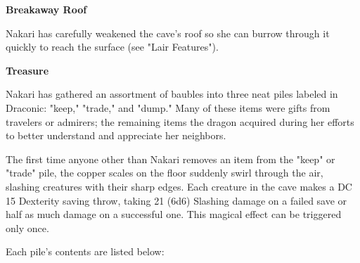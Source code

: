 \documentclass[letterpaper, 11pt, twocolumn]{dndbook}
\begin{document}
\textbf{Breakaway Roof}

Nakari has carefully weakened the cave's roof so she can burrow through it quickly to reach the surface (see "Lair Features").

\textbf{Treasure}

Nakari has gathered an assortment of baubles into three neat piles labeled in Draconic: "keep," "trade," and "dump." Many of these items were gifts from travelers or admirers; the remaining items the dragon acquired during her efforts to better understand and appreciate her neighbors.

The first time anyone other than Nakari removes an item from the "keep" or "trade" pile, the copper scales on the floor suddenly swirl through the air, slashing creatures with their sharp edges. Each creature in the cave makes a DC 15 Dexterity saving throw, taking 21 (6d6) Slashing damage on a failed save or half as much damage on a successful one. This magical effect can be triggered only once.

Each pile's contents are listed below:
\end{document}
